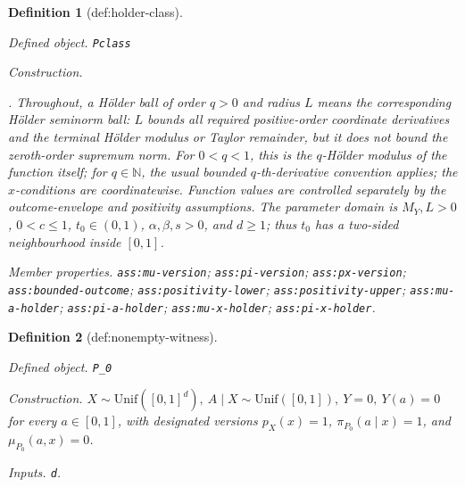 \documentclass{article}
\newtheorem{definition}{Definition}
\begin{document}
\begin{definition}[def:holder-class]\label{def:holder-class}
\par\smallskip\noindent\emph{Defined object.} \texttt{Pclass}
\par\smallskip\noindent\emph{Construction.} \par\noindent {}\par\noindent. Throughout, a H\"older ball of order \(q>0\) and radius \(L\) means the corresponding H\"older seminorm ball: \(L\) bounds all required positive-order coordinate derivatives and the terminal H\"older modulus or Taylor remainder, but it does not bound the zeroth-order supremum norm. For \(0<q<1\), this is the \(q\)-H\"older modulus of the function itself; for \(q\in\mathbb N\), the usual bounded \(q\)-th-derivative convention applies; the \(x\)-conditions are coordinatewise. Function values are controlled separately by the outcome-envelope and positivity assumptions. The parameter domain is \(M_Y,L>0\), \(0<c\le1\), \(t_0\in(0,1)\), \(\alpha,\beta,s>0\), and \(d\ge1\); thus \(t_0\) has a two-sided neighbourhood inside \([0,1]\).
\par\smallskip\noindent\emph{Member properties.} \texttt{ass:\allowbreak{}mu-\allowbreak{}version}; \texttt{ass:\allowbreak{}pi-\allowbreak{}version}; \texttt{ass:\allowbreak{}px-\allowbreak{}version}; \texttt{ass:\allowbreak{}bounded-\allowbreak{}outcome}; \texttt{ass:\allowbreak{}positivity-\allowbreak{}lower}; \texttt{ass:\allowbreak{}positivity-\allowbreak{}upper}; \texttt{ass:\allowbreak{}mu-\allowbreak{}a-\allowbreak{}holder}; \texttt{ass:\allowbreak{}pi-\allowbreak{}a-\allowbreak{}holder}; \texttt{ass:\allowbreak{}mu-\allowbreak{}x-\allowbreak{}holder}; \texttt{ass:\allowbreak{}pi-\allowbreak{}x-\allowbreak{}holder}.
\end{definition}

\begin{definition}[def:nonempty-witness]\label{def:nonempty-witness}
\par\smallskip\noindent\emph{Defined object.} \texttt{P\_\allowbreak{}0}
\par\smallskip\noindent\emph{Construction.} \(X\sim\mathrm{Unif}([0,1]^d),\ A\mid X\sim\mathrm{Unif}([0,1]),\ Y=0,\ Y(a)=0\) for every \(a\in[0,1]\), with designated versions \(p_X(x)=1\), \(\pi_{P_0}(a\mid x)=1\), and \(\mu_{P_0}(a,x)=0\).
\par\smallskip\noindent\emph{Inputs.} \texttt{d}.
\end{definition}
\end{document}
